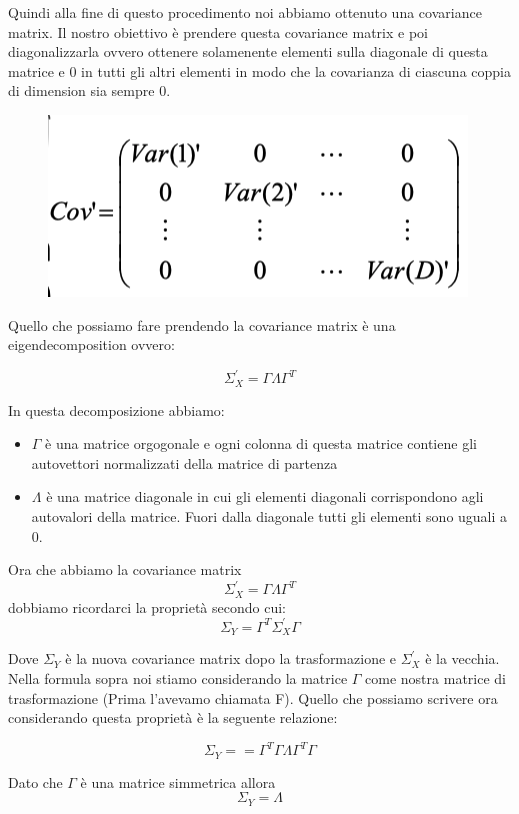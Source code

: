 \documentclass[14pt]{extreport}
\begin{document}
Quindi alla fine di questo procedimento noi abbiamo ottenuto una covariance matrix. Il nostro obiettivo è prendere questa 
covariance matrix e poi diagonalizzarla ovvero ottenere solamenente elementi sulla diagonale di questa matrice e 0 in tutti gli altri 
elementi in modo che la covarianza di ciascuna coppia di dimension sia sempre 0.

\begin{figure}[H] 
	\centering
	\includegraphics[width=0.7\linewidth]{448.jpeg}
	\end{figure}

Quello che possiamo fare prendendo la covariance matrix è una eigendecomposition ovvero:

$$\Sigma_X^{'} = \Gamma \Lambda \Gamma^T$$

In questa decomposizione abbiamo:

\begin{itemize}
	\item $\Gamma$ è una matrice orgogonale e ogni colonna di questa matrice contiene gli autovettori normalizzati della matrice 
	di partenza
	\item $\Lambda$ è una matrice diagonale in cui gli elementi diagonali corrispondono agli autovalori della matrice. Fuori dalla
	diagonale tutti gli elementi sono uguali a 0.
\end{itemize}

Ora che abbiamo la covariance matrix $$\Sigma_X^{'} = \Gamma \Lambda \Gamma^T$$ dobbiamo ricordarci la proprietà secondo cui:
$$\Sigma_Y = \Gamma^T \Sigma_X^{'} \Gamma$$

Dove $\Sigma_Y$ è la nuova covariance matrix dopo la trasformazione e $\Sigma_X^{'}$ è la vecchia. 
Nella formula sopra noi stiamo considerando la matrice $\Gamma$ come nostra matrice di trasformazione (Prima l'avevamo chiamata F).
Quello che possiamo scrivere ora considerando questa proprietà è la seguente relazione:

$$\Sigma_Y == \Gamma^T \Gamma \Lambda \Gamma^T \Gamma $$

Dato che $\Gamma$ è una matrice simmetrica allora $$\Sigma_Y = \Lambda $$
\end{document}
